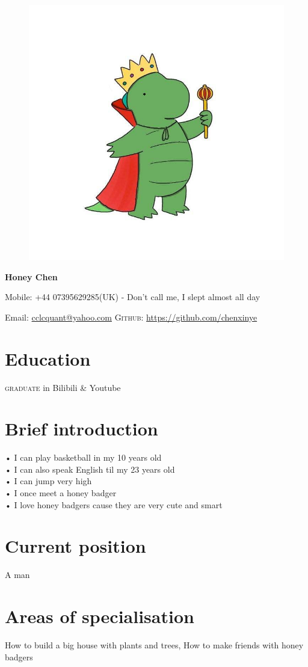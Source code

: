 \documentclass[11pt]{article}
\begin{document}
\begin{figure}
	\centering
	\includegraphics[width=.5\textwidth]{honey.jpg}
	\label{honey profile} 
\end{figure}


{\LARGE\bfseries Honey Chen}
\bigskip\medskip


Mobile: +44 07395629285(UK) - Don't call me, I slept almost all day 
\medskip

\medskip
Email: \href{mailto:cclcquant@yahoo.com}{cclcquant@yahoo.com}
\textsc{Github}: \href{https://github.com/chenxinye}{https://github.com/chenxinye}

\section*{Education}
\textsc{graduate} in Bilibili \& Youtube


\section*{Brief introduction}
• I can play basketball in my 10 years old\\
• I can also speak English til my 23 years old\\
• I can jump very high\\
• I once meet a honey badger\\
• I love honey badgers cause they are very cute and smart


\section*{Current position}
A man


\section*{Areas of specialisation}
How to build a big house with plants and trees, How to make friends with honey badgers
\end{document}

